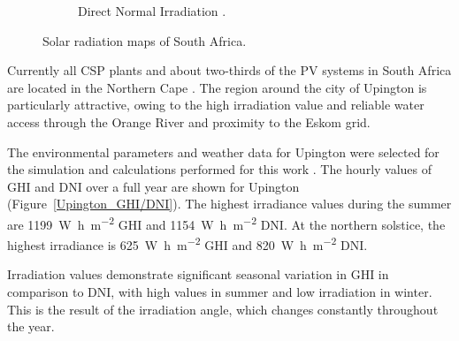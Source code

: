 \begin{figure}[h!]
\begin{subfigure}[b]{0.5\textwidth}
                \caption{Direct Normal Irradiation \cite{SolarGIS2015b}.}\label{fig:bild-rechts}
        \end{subfigure}
        \caption{Solar radiation maps of South Africa.}\label{irradiation}
\end{figure}
\pagebreak

Currently all CSP plants and about two-thirds of the PV systems in South Africa are located in the Northern Cape \cite{Forder2015}. The region around the city of Upington is particularly attractive, owing to the high irradiation value and reliable water access through the Orange River and proximity to the Eskom grid.

The environmental parameters and weather data for Upington were selected for the simulation and calculations performed for this work \cite{WhiteBoxTechnologies2015}. The hourly values of GHI and DNI over a full year are shown for Upington (Figure~\ref{Upington_GHI/DNI}). The highest irradiance values during the summer are \SI{1199}{\watt\hour\per\square\metre} GHI and \SI{1154}{\watt\hour\per\square\metre} DNI. At the northern solstice, the highest irradiance is \SI{625}{\watt\hour\per\square\metre} GHI and \SI{820}{\watt\hour\per\square\metre} DNI. 

Irradiation values demonstrate significant seasonal variation in GHI in comparison to DNI, with high values in summer and low irradiation in winter. This is the result of the irradiation angle, which changes constantly throughout the year. 


